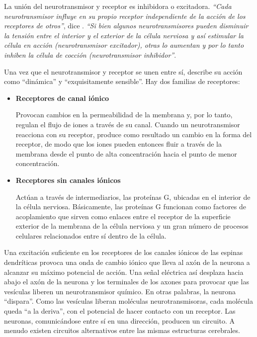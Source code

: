 La unión del neurotransmisor y receptor es inhibidora o excitadora. {\it ``Cada neurotransmisor influye en su propio receptor independiente de la acción de los receptores de otros''}, dice \cite{Restak1995}. {\it ``Si bien algunos neurotransmisores pueden disminuir la tensión entre el interior y el exterior de la célula nerviosa y así estimular la célula en acción (neurotransmisor excitador), otras lo aumentan y por lo tanto inhiben la célula de cocción (neurotransmisor inhibidor''}.

Una vez que el  neurotransmisor y receptor se unen entre sí, \cite{Restak1995} describe su acción como ``dinámica'' y ``exquisitamente sensible''. Hay dos familias de receptores: 

\begin{itemize}

\item {\bf Receptores de canal iónico}

Provocan cambios en la permeabilidad de la membrana y, por lo tanto, regulan el flujo de iones a través de su canal. Cuando un  neurotransmisor reacciona con su receptor, produce como resultado un cambio en la forma del receptor, de modo que los iones pueden entonces fluir a través de la membrana desde el punto de alta concentración hacia el punto de menor concentración.

\item {\bf Receptores sin canales iónicos}

Actúan a través de intermediarios, las proteínas G, ubicadas en el interior de la célula nerviosa. Básicamente, las proteínas G funcionan como factores de acoplamiento que sirven como enlaces entre el receptor de la superficie exterior de la membrana de la célula nerviosa y un gran número de procesos celulares relacionados entre sí dentro de la célula.

\end{itemize}

Una excitación suficiente en los receptores de los canales iónicos de las espinas dendríticas provoca una onda de cambio iónico que lleva al axón de la neurona a alcanzar su máximo potencial de acción. Una señal eléctrica así desplaza hacia abajo el axón de la neurona y los terminales de los axones para provocar que las vesículas liberen un neurotransmisor químico. En otras palabras, la neurona ``dispara''. Como las vesículas liberan moléculas neurotransmisoras, cada molécula queda ``a la deriva'', con el potencial de hacer contacto con un receptor. Las neuronas, comunicándose entre sí en una dirección, producen un circuito. A menudo existen circuitos alternativos entre las mismas estructuras cerebrales.


